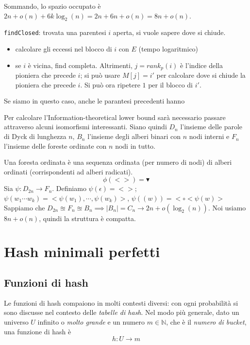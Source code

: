 Sommando, lo spazio occupato è $2n + o(n) + 6k \log_2(n) = 2n + 6n + o(n) = 8n + o(n)$.

\texttt{findClosed}: trovata una parentesi $i$ aperta, si vuole sapere dove si chiude.
\begin{itemize}
	\item calcolare gli eccessi nel blocco di $i$ con $E$ (tempo logaritmico)
	\item se $i$ è vicina, find completa. Altrimenti, $j = rank_p(i)$ è l'indice della pioniera
	      che precede $i$; si può usare $M[j] = i'$ per calcolare dove si chiude la pioniera che precede $i$.
	      Si può ora ripetere $1$ per il blocco di $i'$.

\end{itemize}

Se siamo in questo caso, anche le parantesi precedenti hanno

Per calcolare l'Information-theoretical lower bound sarà necessario passare attraverso alcuni isomorfismi
interessanti. Siano quindi $D_n$ l'insieme delle parole di Dyck di lunghezza $n$, $B_n$ l'insieme degli
alberi binari con $n$ nodi interni e $F_n$ l'insieme delle foreste ordinate con $n$ nodi in tutto.

Una foresta ordinata è una sequenza ordinata (per numero di nodi) di alberi ordinati (corrispondenti
ad alberi radicati).
$$
	\phi(<>) = \blacktriangledown
$$
Sia $\psi: D_{2n} \rightarrow F_n$.
Definiamo $\psi(\epsilon) = <>$; $\psi(w_1 \cdots w_k) =  <\psi(w_1), \cdots, \psi(w_k)>$, $\psi((w)) = <\circ < \psi(w) >$
Sappiamo che $D_{2n} \approxeq F_n \approxeq B_n \implies |B_n| = C_n \rightarrow 2n + o (\log_2(n))$.
Noi usiamo $8n + o(n)$, quindi la struttura è compatta.


\section{Hash minimali perfetti}
\subsection{Funzioni di hash}
Le funzioni di hash compaiono in molti contesti diversi: con ogni probabilità
si sono discusse nel contesto delle \textit{tabelle di hash}.
Nel modo più generale, dato un universo $U$ infinito o \textit{molto grande} e un numero $m \in \mathbb{N}$,
che è il \textit{numero di bucket}, una funzione di hash è
$$
	h: U \rightarrow m
$$


